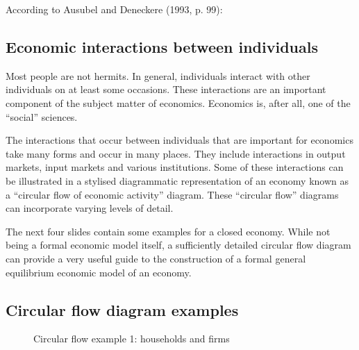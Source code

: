 \documentclass[letterpaper,10pt,english]{jupyterBook}
\begin{document}
\sphinxAtStartPar
According to Ausubel and Deneckere (1993, p. 99):
\begin{quote}

\sphinxAtStartPar
{}
\end{quote}


\subsection{Economic interactions between individuals}
\label{\detokenize{01.intro_to_economics:economic-interactions-between-individuals}}
\sphinxAtStartPar
Most people are not hermits. In general, individuals interact with other individuals on at least some occasions. These interactions are an important component of the subject matter of economics. Economics is, after all, one of the “social” sciences.

\sphinxAtStartPar
The interactions that occur between individuals that are important for economics take many forms and occur in many places. They include interactions in output markets, input markets and various institutions. Some of these interactions can be illustrated in a stylised diagrammatic representation of an economy known as a “circular flow of economic activity” diagram. These “circular flow” diagrams can incorporate varying levels of detail.

\sphinxAtStartPar
The next four slides contain some examples for a closed economy. While not being a formal economic model itself, a sufficiently detailed circular flow diagram can provide a very useful guide to the construction of a formal general equilibrium economic model of an economy.


\subsection{Circular flow diagram examples}
\label{\detokenize{01.intro_to_economics:circular-flow-diagram-examples}}
\begin{figure}[htbp]
\centering
\capstart

\noindent{}
\caption{Circular flow example 1: households and firms}\label{\detokenize{01.intro_to_economics:id5}}\end{figure}
\end{document}

